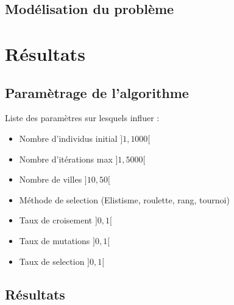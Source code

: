 \documentclass{article}
\begin{document}
	\subsection{Modélisation du problème}

\section{Résultats}
	\subsection{Paramètrage de l'algorithme}

	Liste des paramètres sur lesquels influer :
	\begin{itemize}
	\item Nombre d'individus initial $]1,1000[$
	\item Nombre d'itérations max $]1,5000[$
	\item Nombre de villes $]10,50[$
	\item Méthode de selection (Elistisme, roulette, rang, tournoi)
	\item Taux de croisement $]0,1[$
	\item Taux de mutations $]0,1[$
	\item Taux de selection $]0,1[$
	\end{itemize}

	\subsection{Résultats}
\end{document}
